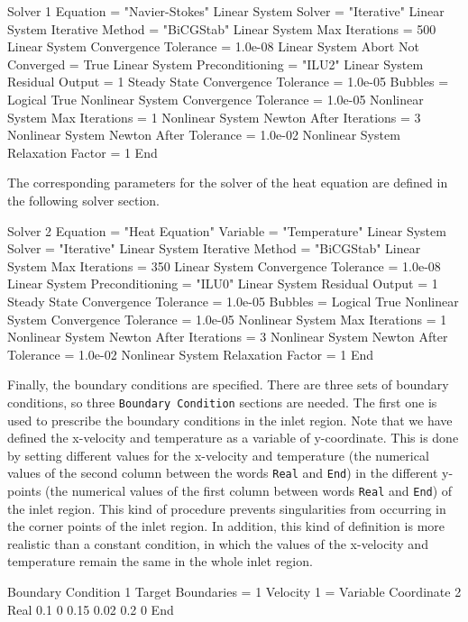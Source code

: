 \begin{flushleft}
\ttbegin
Solver 1
  Equation = "Navier-Stokes"
  Linear System Solver = "Iterative"
  Linear System Iterative Method = "BiCGStab"
  Linear System Max Iterations = 500
  Linear System Convergence Tolerance = 1.0e-08
  Linear System Abort Not Converged = True
  Linear System Preconditioning = "ILU2"
  Linear System Residual Output = 1
  Steady State Convergence Tolerance = 1.0e-05
  Bubbles = Logical True
  Nonlinear System Convergence Tolerance = 1.0e-05
  Nonlinear System Max Iterations = 1
  Nonlinear System Newton After Iterations = 3
  Nonlinear System Newton After Tolerance = 1.0e-02
  Nonlinear System Relaxation Factor = 1
End
\ttend

The corresponding parameters for the solver of the heat equation are defined in the following solver section.

\ttbegin
Solver 2
  Equation = "Heat Equation"
  Variable = "Temperature"
  Linear System Solver = "Iterative"
  Linear System Iterative Method = "BiCGStab"
  Linear System Max Iterations = 350
  Linear System Convergence Tolerance = 1.0e-08
  Linear System Preconditioning = "ILU0"
  Linear System Residual Output = 1
  Steady State Convergence Tolerance = 1.0e-05
  Bubbles = Logical True
  Nonlinear System Convergence Tolerance = 1.0e-05
  Nonlinear System Max Iterations = 1
  Nonlinear System Newton After Iterations = 3
  Nonlinear System Newton After Tolerance = 1.0e-02
  Nonlinear System Relaxation Factor = 1
End
\ttend

Finally, the boundary conditions are specified. There are three sets of boundary conditions, so three {\tt Boundary Condition} sections are needed. The first one is used to prescribe the boundary conditions in the inlet region. Note that we have defined the x-velocity and temperature as a variable of y-coordinate. 
This is done by setting different values for the x-velocity and temperature 
(the numerical values of the second column between the words {\tt Real} and {\tt End})
in the different y-points
(the numerical values of the first column between words {\tt Real} and {\tt End})
of the inlet region.
This kind of procedure prevents singularities from occurring in the corner points of the inlet region. In addition, this kind of definition is more realistic than a constant condition, in which the values of the x-velocity and temperature remain the same in the whole inlet region. 

\ttbegin
Boundary Condition 1
  Target Boundaries = 1
  Velocity 1 = Variable Coordinate 2
    Real 
      0.1    0
      0.15   0.02
      0.2    0
    End


\end{flushleft}
